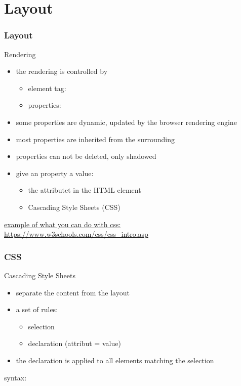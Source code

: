 \section{Layout}

\begin{frame}[fragile]
\frametitle{Layout}
\color{structure}
Rendering
\begin{itemize}\color{structure}
\item the rendering is controlled by
\begin{itemize}
  \item element tag: 
  \item properties: 
\end{itemize} 
\item some properties are dynamic, updated by the browser rendering engine
\item most properties are inherited from the surrounding
\item properties can not be deleted, only shadowed
\item give an property a value:
\begin{itemize}\color{structure}
  \item the  attributet in the HTML element
  \item Cascading Style Sheets (CSS)
  \end{itemize}
\end{itemize}

\bigskip
\href{https://www.w3schools.com/css/css_intro.asp}{example of what you can do with css: https://www.w3schools.com/css/css\_intro.asp}
\end{frame}

\begin{frame}[fragile]
\frametitle{CSS}
\color{structure}
Cascading Style Sheets
\begin{itemize}\color{structure}
\item separate the content from the layout
\item a set of rules:
\begin{itemize}\color{structure}
  \item  selection
  \item declaration (attribut = value)
\end{itemize}
\item the declaration is applied to all elements matching the selection
\end{itemize}
syntax:\\ 
\end{frame}

